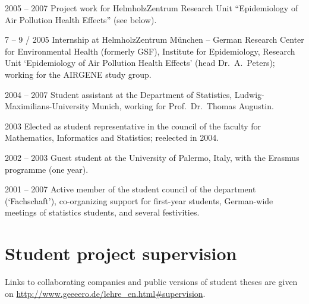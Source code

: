 \documentclass[a4paper]{simplecv}
\begin{document}
\begin{topic}
\item[2005 -- 2007] Project work for HelmholzZentrum Research Unit ``Epidemiology of Air Pollution Health Effects'' (see below).

\item[7 -- 9 / 2005] Internship at HelmholzZentrum M\"unchen -- German Research Center for Environmental Health (formerly GSF),
Institute for Epidemiology, Research Unit `Epidemiology of Air Pollution Health Effects' (head Dr.\ A.\ Peters);
working for the AIRGENE study group.

\item[2004 -- 2007] Student assistant at the Department of Statistics, Ludwig-Maximi\-li\-ans-Uni\-ver\-si\-ty Munich,
working for Prof.\ Dr.\ Thomas Augustin.

\item[2003] Elected as student representative in the council of the faculty for Mathematics, Informatics and Statistics; reelected in 2004.

\item[2002 -- 2003] Guest student at the University of Palermo, Italy, with the Erasmus programme (one year). %

\item[2001 -- 2007] Active member of the student council of the department (`Fachschaft'),
co-organizing support for first-year students, German-wide meetings of statistics students, and several festivities.

\end{topic}


\section{Student project supervision}
\label{supervision}

Links to collaborating companies and public versions of student theses are given on \url{http://www.geeeero.de/lehre_en.html#supervision}.
\end{document}
